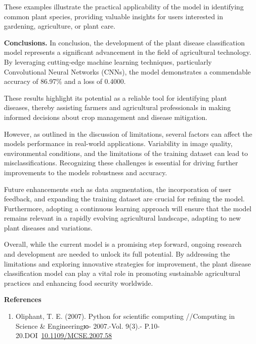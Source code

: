 \documentclass[
]{article}
\begin{document}
These examples illustrate the practical applicability of the model in
identifying common plant species, providing valuable insights for users
interested in gardening, agriculture, or plant care.

\textbf{Conclusions.} In conclusion, the development of the plant
disease classification model represents a significant advancement in the
field of agricultural technology. By leveraging cutting-edge machine
learning techniques, particularly Convolutional Neural Networks (CNNs),
the model demonstrates a commendable accuracy of 86.97\% and a loss of
0.4000.

These results highlight its potential as a reliable tool for identifying
plant diseases, thereby assisting farmers and agricultural professionals
in making informed decisions about crop management and disease
mitigation.

However, as outlined in the discussion of limitations, several factors
can affect the model\textquotesingle s performance in real-world
applications. Variability in image quality, environmental conditions,
and the limitations of the training dataset can lead to
misclassifications. Recognizing these challenges is essential for
driving further improvements to the model\textquotesingle s robustness
and accuracy.

Future enhancements such as data augmentation, the incorporation of user
feedback, and expanding the training dataset are crucial for refining
the model. Furthermore, adopting a continuous learning approach will
ensure that the model remains relevant in a rapidly evolving
agricultural landscape, adapting to new plant diseases and variations.

Overall, while the current model is a promising step forward, ongoing
research and development are needed to unlock its full potential. By
addressing the limitations and exploring innovative strategies for
improvement, the plant disease classification model can play a vital
role in promoting sustainable agricultural practices and enhancing food
security worldwide.

\textbf{References}

\begin{enumerate}
\def\labelenumi{\arabic{enumi}.}
\item
  Oliphant, T. E. (2007). Python for scientific computing //Computing in
  Science \& Engineeringю- 2007.-Vol. 9(3).-
  P.10-20.DOI~\href{https://doi.org/10.1109/MCSE.2007.58}{10.1109/MCSE.2007.58}
\end{enumerate}
\end{document}
